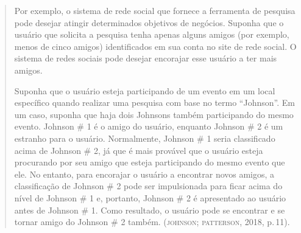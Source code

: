 

\begin{quote}
Por exemplo, o sistema de rede social que fornece a ferramenta de
pesquisa pode desejar atingir determinados objetivos de negócios.
Suponha que o usuário que solicita a pesquisa tenha apenas alguns amigos
(por exemplo, menos de cinco amigos) identificados em sua conta no site
de rede social. O sistema de redes sociais pode desejar encorajar esse
usuário a ter mais amigos. 

Suponha que o usuário esteja participando de
um evento em um local específico quando realizar uma pesquisa com base
no termo ``Johnson''. Em um caso, suponha que haja dois Johnsons também
participando do mesmo evento. Johnson \# 1 é o amigo do usuário,
enquanto Johnson \# 2 é um estranho para o usuário. Normalmente, Johnson
\# 1 seria classificado acima de Johnson \# 2, já que é mais provável
que o usuário esteja procurando por seu amigo que esteja participando do
mesmo evento que ele. No entanto, para encorajar o usuário a encontrar
novos amigos, a classificação de Johnson \# 2 pode ser impulsionada para
ficar acima do nível de Johnson \# 1 e, portanto, Johnson \# 2 é
apresentado ao usuário antes de Johnson \# 1. Como resultado, o usuário
pode se encontrar e se tornar amigo do Johnson \# 2 também. (\textsc{johnson}; \textsc{patterson}, 2018, p.\,11).
\end{quote}


